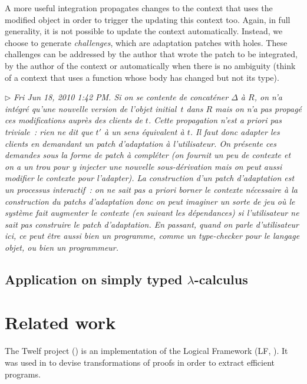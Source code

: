 \documentclass{article}
\newcommand{\remtext}[1]{\textcolor{bwgreen}{$\triangleright$ \textsl{#1}}}
\begin{document}
A more useful integration propagates changes to the context that uses
the modified object in order to trigger the updating this context
too. Again, in full generality, it is not possible to update the
context automatically. Instead, we choose to generate
\textit{challenges}, which are adaptation patches with holes. These
challenges can be addressed by the author that wrote the patch to be
integrated, by the author of the context or automatically when there
is no ambiguity (think of a context that uses a function whose
body has changed but not its type). 

\remtext{Fri Jun 18, 2010 1:42 PM. Si on se contente de concaténer
  $\Delta$ à $R$, on n'a intégré qu'une nouvelle version de l'objet
  initial~$t$ dans $R$ mais on n'a pas propagé ces modifications
  auprès des clients de $t$. Cette propagation n'est \textit{a priori}
  pas triviale~: rien ne dit que $t'$ à un sens équivalent à $t$. Il
  faut donc adapter les clients en demandant un patch d'adaptation à
  l'utilisateur. On présente ces demandes sous la forme de patch à
  compléter (on fournit un peu de contexte et on a un trou pour y
  injecter une nouvelle sous-dérivation mais on peut aussi modifier le
  contexte pour l'adapter). La construction d'un patch d'adaptation
  est un processus interactif~: on ne sait pas a priori borner le
  contexte nécessaire à la construction du patchs d'adaptation donc on
  peut imaginer un sorte de jeu où le système fait augmenter le
  contexte (en suivant les dépendances) si l'utilisateur ne sait pas
  construire le patch d'adaptation. En passant, quand on parle
  d'utilisateur ici, ce peut être aussi bien un programme, comme un
  type-checker pour le langage objet, ou bien un programmeur.}

\subsection{Application on simply typed $\lambda$-calculus}

\section{Related work}
\label{rw}

The \textsf{Twelf} project (\cite{pfenning1999system}) is an
implementation of the Logical Framework (LF,
\cite{harper1993framework}). It was used in \cite{anderson1993program}
to devise transformations of proofs in order to extract efficient
programs.
\end{document}
